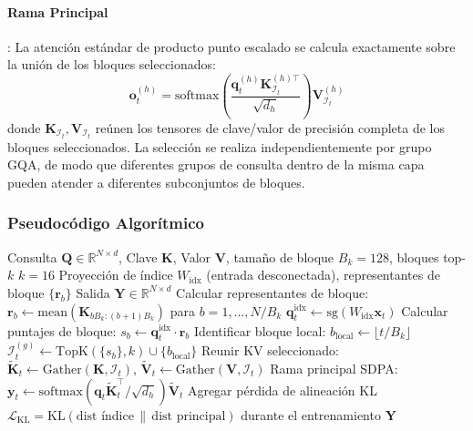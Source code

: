 \paragraph{Rama Principal}: La atención estándar de producto punto escalado se calcula exactamente sobre la unión de los bloques seleccionados:
\[
\mathbf{o}_t^{(h)} = \mathrm{softmax}\left(\frac{\mathbf{q}_t^{(h)} \mathbf{K}_{\mathcal{I}_t}^{(h)\top}}{\sqrt{d_h}}\right) \mathbf{V}_{\mathcal{I}_t}^{(h)}
\]
donde $\mathbf{K}_{\mathcal{I}_t}, \mathbf{V}_{\mathcal{I}_t}$ reúnen los tensores de clave/valor de precisión completa de los bloques seleccionados. La selección se realiza independientemente por grupo GQA, de modo que diferentes grupos de consulta dentro de la misma capa pueden atender a diferentes subconjuntos de bloques.

\subsubsection{Pseudocódigo Algorítmico}

\begin{algorithm}[H]
\caption{MSA: Atención Dispersa MiniMax con Ramas de Índice + Principal}
\begin{algorithmic}[1]
\Require Consulta $\mathbf{Q} \in \mathbb{R}^{N \times d}$, Clave $\mathbf{K}$, Valor $\mathbf{V}$, tamaño de bloque $B_k = 128$, bloques top-$k$ $k = 16$
\Require Proyección de índice $W_{\text{idx}}$ (entrada desconectada), representantes de bloque $\{\mathbf{r}_b\}$
\Ensure Salida $\mathbf{Y} \in \mathbb{R}^{N \times d}$
\State Calcular representantes de bloque: $\mathbf{r}_b \gets \mathrm{mean}(\mathbf{K}_{bB_k:(b+1)B_k})$ para $b = 1, \ldots, N/B_k$
        \State $\mathbf{q}_t^{\text{idx}} \gets \mathrm{sg}(W_{\text{idx}} \mathbf{x}_t)$ 
        \State Calcular puntajes de bloque: $s_b \gets \mathbf{q}_t^{\text{idx}} \cdot \mathbf{r}_b$
        \State Identificar bloque local: $b_{\text{local}} \gets \lfloor t / B_k \rfloor$
        \State $\mathcal{I}_t^{(g)} \gets \mathrm{TopK}(\{s_b\}, k) \cup \{b_{\text{local}}\}$ 
    \EndFor
    \State Reunir KV seleccionado: $\tilde{\mathbf{K}}_t \gets \mathrm{Gather}(\mathbf{K}, \mathcal{I}_t)$, $\tilde{\mathbf{V}}_t \gets \mathrm{Gather}(\mathbf{V}, \mathcal{I}_t)$
    \State Rama principal SDPA: $\mathbf{y}_t \gets \mathrm{softmax}(\mathbf{q}_t \tilde{\mathbf{K}}_t^\top / \sqrt{d_h}) \tilde{\mathbf{V}}_t$
\EndFor
\State Agregar pérdida de alineación KL $\mathcal{L}_{\text{KL}} = \mathrm{KL}(\text{dist índice} \,\|\, \text{dist principal})$ durante el entrenamiento
\Return $\mathbf{Y}$
\end{algorithmic}
\end{algorithm}

